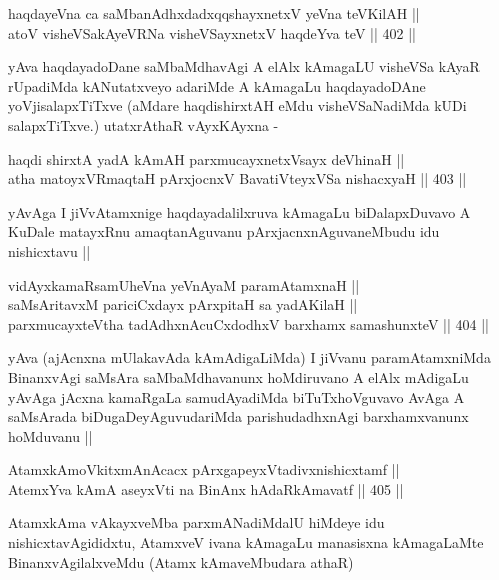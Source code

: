 
\begin{shl}
haqdayeVna ca saMbanAdhxdadxqqshayxnetxV yeVna teV\s KilAH || \\
atoV visheVSakAyeVRNa visheVSayxnetxV haqdeYva teV ||  402 ||  
\end{shl}

\begin{artha}
yAva haqdayadoDane saMbaMdhavAgi A elAlx kAmagaLU visheVSa kAyaR
rUpadiMda kANutatxveyo adariMde A kAmagaLu haqdayadoDAne
yoVjisalapxTiTxve (aMdare haqdishirxtAH eMdu visheVSaNadiMda kUDi
salapxTiTxve.) utatxrAthaR vAyxKAyxna -
\end{artha}

\begin{shl}
haqdi shirxtA yadA kAmAH parxmucayxnetxV\s sayx deVhinaH || \\
atha matoyxVR\s maqtaH pArxjocnxV BavatiVteyxVSa nishacxyaH ||  403 ||  
\end{shl}

\begin{artha}
yAvAga I jiVvAtamxnige haqdayadalilxruva kAmagaLu biDalapxDuvavo A
KuDale matayxRnu amaqtanAguvanu pArxjacnxnAguvaneMbudu idu nishicxtavu ||
\end{artha}

\begin{shl}
vidAyxkamaRsamUheVna yeVnAyaM paramAtamxnaH || \\
saMsAritavxM pariciCxdayx pArxpitaH sa yadA\s KilaH || \\
parxmucayxteV\s tha tadAdhxnAcuCxdodhxV barxhamx samashunxteV ||  404 ||  
\end{shl}

\begin{artha}
yAva (ajAcnxna mUlakavAda kAmAdigaLiMda) I jiVvanu paramAtamxniMda
BinanxvAgi saMsAra saMbaMdhavanunx hoMdiruvano A elAlx mAdigaLu yAvAga
jAcxna kamaRgaLa samudAyadiMda biTuTxhoVguvavo AvAga A saMsArada
biDugaDeyAguvudariMda parishudadhxnAgi barxhamxvanunx hoMduvanu ||
\end{artha}

\begin{shl}
AtamxkAmoVkitxmAnAcacx pArxgapeyxVtadivxnishicxtamf || \\
AtemxYva kAmA aseyxVti na BinAnx hAdaRkAmavatf ||  405 ||  
\end{shl}

\begin{artha}
AtamxkAma vAkayxveMba parxmANadiMdalU hiMdeye idu nishicxtavAgididxtu,
AtamxveV ivana kAmagaLu manasisxna kAmagaLaMte BinanxvAgilalxveMdu
(Atamx kAmaveMbudara athaR)
\end{artha}

